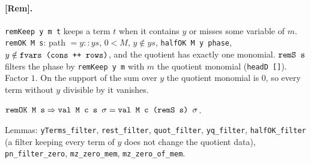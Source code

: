 \paragraph{[Rem].} \textnormal{\texttt{remKeep y m t}} keeps a term $t$ when it contains $y$ or misses some
variable of $m$. \textnormal{\texttt{remOK M s}}: path $=y::ys$, $0<M$, $y\notin ys$, \textnormal{\texttt{halfOK M y phase}},
$y\notin\textnormal{\texttt{fvars (\allowbreak{}cons ++ rows)}}$, and the quotient has exactly one monomial.
$\textnormal{\texttt{remS s}}$ filters the phase by \textnormal{\texttt{remKeep y m}} with $m$ the quotient monomial
(\textnormal{\texttt{headD []}}). Factor $1$. On the support of the sum over $y$ the quotient monomial is $0$, so
every term without $y$ divisible by it vanishes.
\begin{theorem}
$\textnormal{\texttt{remOK M s}}\Rightarrow\textnormal{\texttt{val M c s \ensuremath{\sigma}}} = \textnormal{\texttt{val M c (\allowbreak{}remS s) \ensuremath{\sigma}}}$.
\end{theorem}
\noindent Lemmas: \textnormal{\texttt{yTerms\_\allowbreak{}filter}}, \textnormal{\texttt{rest\_\allowbreak{}filter}}, \textnormal{\texttt{quot\_\allowbreak{}filter}},
\textnormal{\texttt{yq\_\allowbreak{}filter}}, \textnormal{\texttt{halfOK\_\allowbreak{}filter}} (a filter keeping every term of $y$ does not change the
quotient data), \textnormal{\texttt{pn\_\allowbreak{}filter\_\allowbreak{}zero}}, \textnormal{\texttt{mz\_\allowbreak{}zero\_\allowbreak{}mem}}, \textnormal{\texttt{mz\_\allowbreak{}zero\_\allowbreak{}of\_\allowbreak{}mem}}.

